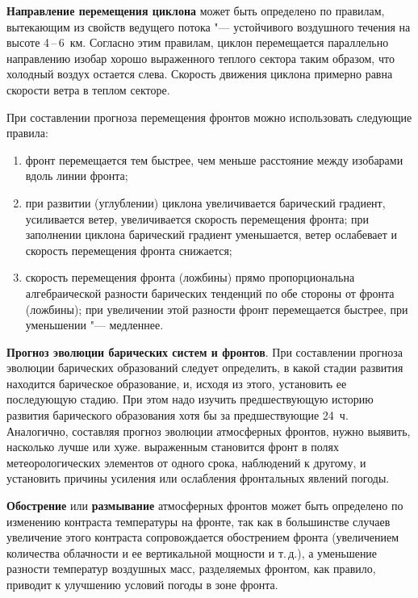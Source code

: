 \documentclass[a4paper, 12pt, twoside, final, book, russian, fittopage, cyremdash, openright]{ncc}
\newcommand{\otdo}{\,--\,}
\begin{document}
\textbf{Направление перемещения циклона} может быть определено по правилам, вытекающим из свойств
ведущего потока "--- устойчивого воздушного течения на высоте 4\otdo6~км.
Согласно этим правилам, циклон перемещается параллельно
направлению изобар хорошо выраженного теплого сектора таким образом,
что холодный воздух остается слева. Скорость движения циклона примерно
равна скорости ветра в теплом секторе.

При составлении прогноза перемещения фронтов можно использовать
следующие правила:
\begin{enumerate}[label={\textbullet~}]
\item фронт перемещается тем быстрее, чем меньше расстояние между
  изобарами вдоль линии фронта;
\item при развитии (углублении) циклона увеличивается барический
  градиент, усиливается ветер, увеличивается скорость перемещения
  фронта; при заполнении циклона барический градиент уменьшается,
  ветер ослабевает и скорость перемещения фронта снижается;
\item скорость перемещения фронта (ложбины) прямо пропорциональна
  алгебраической разности барических тенденций по обе стороны от
  фронта (ложбины); при увеличении этой разности фронт перемещается
  быстрее, при уменьшении "--- медленнее.
\end{enumerate}

\textbf{Прогноз эволюции барических систем и фронтов}. При составлении прогноза
эволюции барических образований следует определить, в какой стадии
развития находится барическое образование, и, исходя из этого,
установить ее последующую стадию. При этом надо изучить предшествующую
историю развития барического образования хотя бы за предшествующие
24~ч. Аналогично, составляя прогноз эволюции атмосферных фронтов,
нужно выявить, насколько лучше или хуже. выраженным становится фронт в
полях метеорологических элементов от одного срока, наблюдений к
другому, и установить причины усиления или ослабления фронтальных
явлений погоды.

\textbf{Обострение} или
\textbf{размывание} атмосферных фронтов может
быть определено по изменению контраста температуры на фронте, так как
в большинстве случаев увеличение этого контраста сопровождается
обострением фронта (увеличением количества облачности и ее
вертикальной мощности и т.\,д.), а уменьшение разности температур
воздушных масс, разделяемых фронтом, как правило, приводит к улучшению
условий погоды в зоне фронта.
\end{document}
